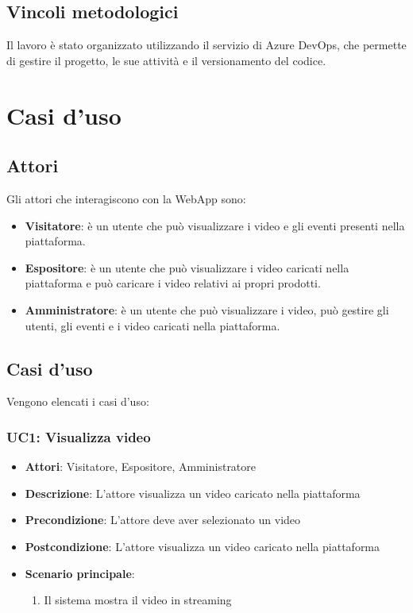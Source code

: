 \subsection{Vincoli metodologici}
\label{subsec:vincoli-metodologici}
Il lavoro è stato organizzato utilizzando il servizio di Azure DevOps, che permette di gestire il progetto, le sue attività e il versionamento del codice.\\
\section{Casi d'uso}
\label{sec:casi-duso}
\subsection{Attori}
\label{subsec:attori}
Gli attori che interagiscono con la WebApp sono:
\begin{itemize}
    \item \textbf{Visitatore}: è un utente che può visualizzare i video e gli eventi presenti nella piattaforma.
    \item \textbf{Espositore}: è un utente che può visualizzare i video caricati nella piattaforma e può caricare i video relativi ai propri prodotti.
    \item \textbf{Amministratore}: è un utente che può visualizzare i video, può gestire gli utenti, gli eventi e i video caricati nella piattaforma.
\end{itemize}
\subsection{Casi d'uso}
\label{subsec:casi-duso}
Vengono elencati i casi d'uso:
\subsubsection{UC1: Visualizza video}
\label{subsubsec:uc1}
\begin{itemize}
    \item \textbf{Attori}: Visitatore, Espositore, Amministratore
    \item \textbf{Descrizione}: L'attore visualizza un video caricato nella piattaforma
    \item \textbf{Precondizione}: L'attore deve aver selezionato un video
    \item \textbf{Postcondizione}: L'attore visualizza un video caricato nella piattaforma
    \item \textbf{Scenario principale}:
    \begin{enumerate}
        \item Il sistema mostra il video in streaming
    \end{enumerate}
\end{itemize}

